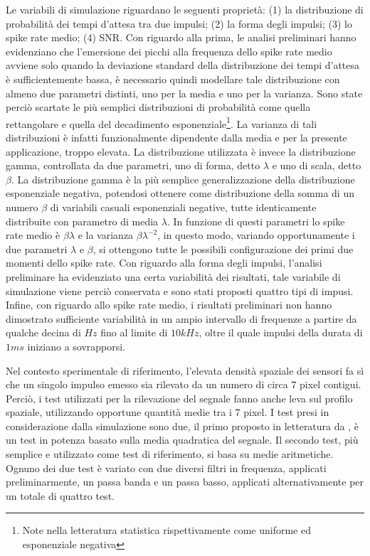 \documentclass[9pt,twocolumn,twoside]{osajnl}
\begin{document}
Le variabili di simulazione riguardano le seguenti proprietà: (1) la distribuzione di probabilità dei tempi d'attesa tra due impulsi; (2) la forma degli impulsi; (3) lo spike rate medio; (4) SNR. Con riguardo alla prima, le analisi preliminari hanno evidenziano che l'emersione dei picchi alla frequenza dello spike rate medio avviene solo quando la deviazione standard della distribuzione dei tempi d'attesa è sufficientemente bassa, è necessario quindi modellare tale distribuzione con almeno due parametri distinti, uno per la media e uno per la varianza. Sono state perciò scartate le più semplici distribuzioni di probabilità come quella rettangolare e quella del decadimento esponenziale\footnote{Note nella letteratura statistica rispettivamente come uniforme ed esponenziale negativa}. La varianza di tali distribuzioni è infatti funzionalmente dipendente dalla media e per la presente applicazione, troppo elevata. La distribuzione utilizzata è invece la distribuzione gamma, controllata da due parametri, uno di forma, detto $\lambda$ e uno di scala, detto $\beta$. La distribuzione gamma è la più semplice generalizzazione della distribuzione esponenziale negativa, potendosi ottenere come distribuzione della somma di un numero $\beta$ di variabili casuali esponenziali negative, tutte identicamente distribuite con parametro di media $\lambda$. In funzione di questi parametri lo spike rate medio è $\beta\lambda$ e la varianza $\beta\lambda^{-2}$, in questo modo, variando opportunamente i due parametri $\lambda$ e $\beta$, si ottengono tutte le possibili configurazione dei primi due momenti dello spike rate. Con riguardo alla forma degli impulsi, l'analisi preliminare ha evidenziato una certa variabilità dei risultati, tale variabile di simulazione viene perciò conservata e sono stati proposti quattro tipi di impusi. Infine, con riguardo allo spike rate medio, i risultati preliminari non hanno dimostrato sufficiente variabilità in un ampio intervallo di frequenze a partire da qualche decina di $Hz$ fino al limite di $10kHz$, oltre il quale impulsi della durata di $1ms$ iniziano a sovrapporsi.

Nel contesto sperimentale di riferimento, l'elevata densità spaziale dei sensori fa sì che un singolo impulso emesso sia rilevato da un numero di circa $7$ pixel contigui. Perciò, i test utilizzati per la rilevazione del segnale fanno anche leva sul profilo spaziale, utilizzando opportune quantità medie tra i 7 pixel. I test presi in considerazione dalla simulazione sono due, il primo proposto in letteratura da \cite{Lambacher2011}, è un test in potenza basato sulla media quadratica del segnale. Il secondo test, più semplice e utilizzato come test di riferimento, si basa su medie aritmetiche. Ognuno dei due test è variato con due diversi filtri in frequenza, applicati preliminarmente, un passa banda e un passa basso, applicati alternativamente per un totale di quattro test.
\end{document}
